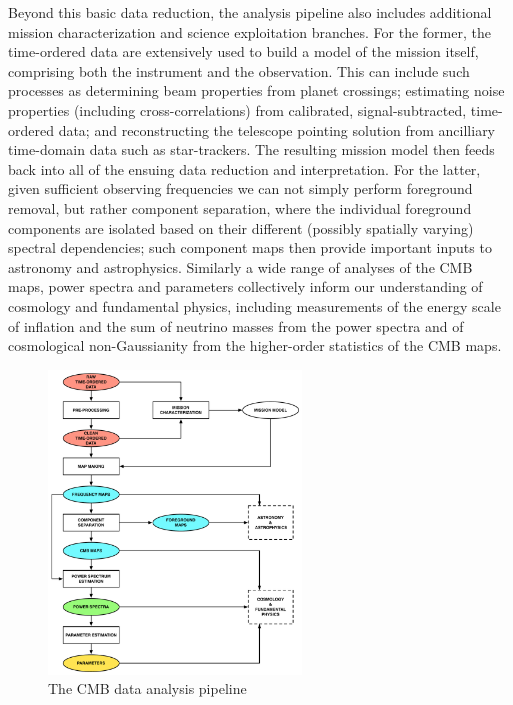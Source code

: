 Beyond this basic data reduction, the analysis pipeline also includes additional mission characterization and science exploitation branches. For the former, the time-ordered data are extensively used to build a model of the mission itself, comprising both the instrument and the observation. This can include such processes as determining beam properties from planet crossings; estimating noise properties (including cross-correlations) from calibrated, signal-subtracted, time-ordered data; and reconstructing the telescope pointing solution from ancilliary time-domain data such as star-trackers. The resulting mission model then feeds back into all of the ensuing data reduction and interpretation. For the latter, given sufficient observing frequencies we can not simply perform foreground removal, but rather component separation, where the individual foreground components are isolated based on their different (possibly spatially varying) spectral dependencies; such component maps then provide important inputs to astronomy and astrophysics. Similarly a wide range of analyses of the CMB maps, power spectra and parameters collectively inform our understanding of cosmology and fundamental physics, including measurements of the energy scale of inflation and the sum of neutrino masses from the power spectra and of cosmological non-Gaussianity from the higher-order statistics of the CMB maps.

\begin{figure}[tbp]
\hspace*{2.6in}\includegraphics[width=0.6\textwidth]{Analysis/da}
\caption{The CMB data analysis pipeline}
\label{fig_da}
\end{figure}

